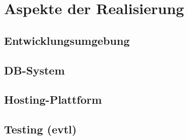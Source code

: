 \chapter{Aspekte der Realisierung}
\label{cha:realisierung}

\section{Entwicklungsumgebung}
\label{sec:entwicklungsumgebung}

\section{DB-System}
\label{sec:DB-System}

\section{Hosting-Plattform}
\label{sec:Hosting-Plattform}

\section{Testing (evtl)}
\label{sec:Testing}